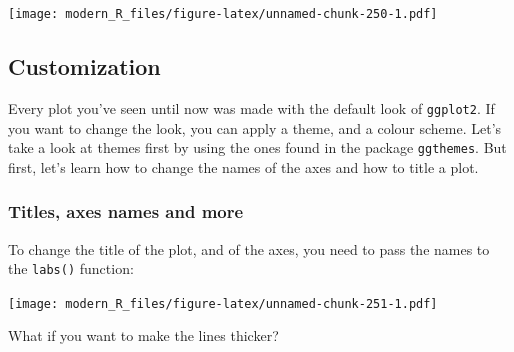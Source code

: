 \documentclass[]{gitbook}
\newenvironment{Shaded}{\begin{snugshade}}{\end{snugshade}}
\newcommand{\DataTypeTok}[1]{\textcolor[rgb]{0.13,0.29,0.53}{#1}}
\newcommand{\KeywordTok}[1]{\textcolor[rgb]{0.13,0.29,0.53}{\textbf{#1}}}
\newcommand{\NormalTok}[1]{#1}
\newcommand{\OperatorTok}[1]{\textcolor[rgb]{0.81,0.36,0.00}{\textbf{#1}}}
\newcommand{\StringTok}[1]{\textcolor[rgb]{0.31,0.60,0.02}{#1}}
\theoremstyle{definition}
\theoremstyle{definition}
\theoremstyle{definition}
\theoremstyle{remark}
\begin{document}
\texttt{[image: modern\_R\_files/figure-latex/unnamed-chunk-250-1.pdf]}

\hypertarget{customization}{%
\subsection{Customization}\label{customization}}

Every plot you've seen until now was made with the default look of
\texttt{ggplot2}. If you want to change the look, you can apply a theme,
and a colour scheme. Let's take a look at themes first by using the ones
found in the package \texttt{ggthemes}. But first, let's learn how to
change the names of the axes and how to title a plot.

\hypertarget{titles-axes-names-and-more}{%
\subsubsection{Titles, axes names and
more}\label{titles-axes-names-and-more}}

To change the title of the plot, and of the axes, you need to pass the
names to the \texttt{labs()} function:

\begin{Shaded}
\end{Shaded}

\texttt{[image: modern\_R\_files/figure-latex/unnamed-chunk-251-1.pdf]}

What if you want to make the lines thicker?
\end{document}
